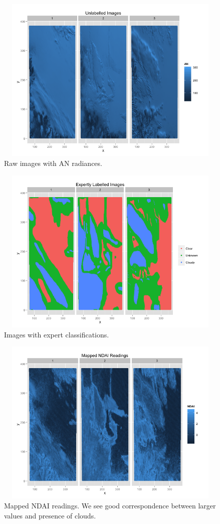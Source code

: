 \documentclass{article}\usepackage[]{graphicx}\usepackage[]{color}
\begin{document}
\begin{figure}[H]
\includegraphics[width = 18cm, height=8cm]{RAWEDA.png}
\caption{Raw images with AN radiances.}
\end{figure}

\begin{figure}[H]
\includegraphics[width = 18cm, height=8cm]{EXPERTSEDA.png}
\caption{Images with expert classifications.}
\end{figure}

\begin{figure}[H]
\includegraphics[width = 18cm, height = 8cm]{NDAIEDA.png}
\caption{Mapped NDAI readings. We see good correspondence between larger values and presence of clouds.}
\end{figure}
\end{document}
